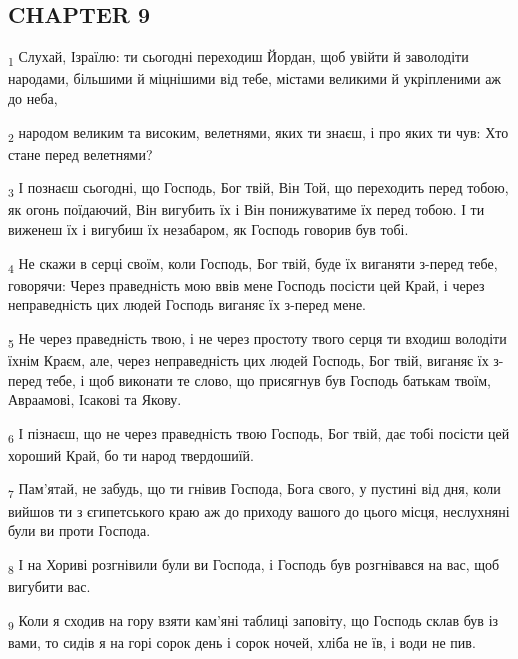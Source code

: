 \subsection{CHAPTER 9}
\begin{tcolorbox}
\textsubscript{1} Слухай, Ізраїлю: ти сьогодні переходиш Йордан, щоб увійти й заволодіти народами, більшими й міцнішими від тебе, містами великими й укріпленими аж до неба,
\end{tcolorbox}
\begin{tcolorbox}
\textsubscript{2} народом великим та високим, велетнями, яких ти знаєш, і про яких ти чув: Хто стане перед велетнями?
\end{tcolorbox}
\begin{tcolorbox}
\textsubscript{3} І познаєш сьогодні, що Господь, Бог твій, Він Той, що переходить перед тобою, як огонь поїдаючий, Він вигубить їх і Він понижуватиме їх перед тобою. І ти виженеш їх і вигубиш їх незабаром, як Господь говорив був тобі.
\end{tcolorbox}
\begin{tcolorbox}
\textsubscript{4} Не скажи в серці своїм, коли Господь, Бог твій, буде їх виганяти з-перед тебе, говорячи: Через праведність мою ввів мене Господь посісти цей Край, і через неправедність цих людей Господь виганяє їх з-перед мене.
\end{tcolorbox}
\begin{tcolorbox}
\textsubscript{5} Не через праведність твою, і не через простоту твого серця ти входиш володіти їхнім Краєм, але, через неправедність цих людей Господь, Бог твій, виганяє їх з-перед тебе, і щоб виконати те слово, що присягнув був Господь батькам твоїм, Авраамові, Ісакові та Якову.
\end{tcolorbox}
\begin{tcolorbox}
\textsubscript{6} І пізнаєш, що не через праведність твою Господь, Бог твій, дає тобі посісти цей хороший Край, бо ти народ твердошиїй.
\end{tcolorbox}
\begin{tcolorbox}
\textsubscript{7} Пам'ятай, не забудь, що ти гнівив Господа, Бога свого, у пустині від дня, коли вийшов ти з єгипетського краю аж до приходу вашого до цього місця, неслухняні були ви проти Господа.
\end{tcolorbox}
\begin{tcolorbox}
\textsubscript{8} І на Хориві розгнівили були ви Господа, і Господь був розгнівався на вас, щоб вигубити вас.
\end{tcolorbox}
\begin{tcolorbox}
\textsubscript{9} Коли я сходив на гору взяти кам'яні таблиці заповіту, що Господь склав був із вами, то сидів я на горі сорок день і сорок ночей, хліба не їв, і води не пив.
\end{tcolorbox}
